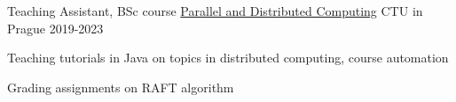 \begin{cventries}
  \cventry
    {Teaching Assistant, BSc course} %
    {\href{https://cw.fel.cvut.cz/b222/courses/b4b36pdv/tutorials/start}{Parallel and Distributed Computing}} %
    {CTU in Prague} %
    {2019-2023} %
    {
      \begin{cvitems} %
        \item {Teaching tutorials in Java on topics in distributed computing, course automation}
        \item {Grading assignments on RAFT algorithm}
      \end{cvitems}
    }

\end{cventries}
    


